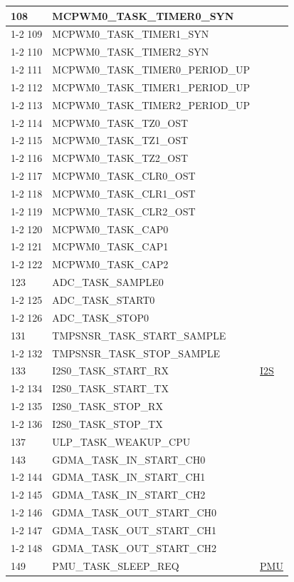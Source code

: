 \documentclass[main\_\_EN.tex]{subfiles}
\begin{document}
\begin{longtable}{ | l | l | l | }
108 & MCPWM0\_TASK\_TIMER0\_SYN & \\ \cline{1-2}
109 & MCPWM0\_TASK\_TIMER1\_SYN & \\ \cline{1-2}
110 & MCPWM0\_TASK\_TIMER2\_SYN & \\ \cline{1-2}
111 & MCPWM0\_TASK\_TIMER0\_PERIOD\_UP      & \\ \cline{1-2}
112 & MCPWM0\_TASK\_TIMER1\_PERIOD\_UP      & \\ \cline{1-2}
113 & MCPWM0\_TASK\_TIMER2\_PERIOD\_UP      & \\ \cline{1-2}
114 & MCPWM0\_TASK\_TZ0\_OST  & \\ \cline{1-2}
115 & MCPWM0\_TASK\_TZ1\_OST  & \\ \cline{1-2}
116 & MCPWM0\_TASK\_TZ2\_OST  & \\ \cline{1-2}
117 & MCPWM0\_TASK\_CLR0\_OST & \\ \cline{1-2}
118 & MCPWM0\_TASK\_CLR1\_OST & \\ \cline{1-2}
119 & MCPWM0\_TASK\_CLR2\_OST & \\ \cline{1-2}
120 & MCPWM0\_TASK\_CAP0      & \\ \cline{1-2}
121 & MCPWM0\_TASK\_CAP1      & \\ \cline{1-2}
122 & MCPWM0\_TASK\_CAP2      & \\ \hline
123 & ADC\_TASK\_SAMPLE0     & \nameref{mod:adc}   \\ \cline{1-2}
125 & ADC\_TASK\_START0      & \\ \cline{1-2}
126 & ADC\_TASK\_STOP0& \\ \hline
131 & TMPSNSR\_TASK\_START\_SAMPLE  & \nameref{mod:tmpsen}      \\ \cline{1-2}
132 & TMPSNSR\_TASK\_STOP\_SAMPLE   & \\ \hline
133 & I2S0\_TASK\_START\_RX   & \hyperref[mod:i2s]{I2S}   \\ \cline{1-2}
134 & I2S0\_TASK\_START\_TX   & \\ \cline{1-2}
135 & I2S0\_TASK\_STOP\_RX    & \\ \cline{1-2}
136 & I2S0\_TASK\_STOP\_TX    & \\ \hline
137 & ULP\_TASK\_WEAKUP\_CPU & \nameref{mod:ulp} \\ \hline
143 & GDMA\_TASK\_IN\_START\_CH0    & \nameref{mod:dma}  \\ \cline{1-2}
144 & GDMA\_TASK\_IN\_START\_CH1    & \\ \cline{1-2}
145 & GDMA\_TASK\_IN\_START\_CH2    & \\ \cline{1-2}
146 & GDMA\_TASK\_OUT\_START\_CH0   & \\ \cline{1-2}
147 & GDMA\_TASK\_OUT\_START\_CH1   & \\ \cline{1-2}
148 & GDMA\_TASK\_OUT\_START\_CH2   & \\ \hline
149 & PMU\_TASK\_SLEEP\_REQ  & \hyperref[mod:lowpowm]{PMU} \\ \hline
\end{longtable}
\end{document}
